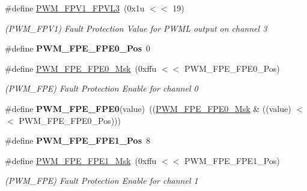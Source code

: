 \begin{DoxyCompactItemize}
\mbox{\label{group__SAMS70__PWM_ga7e0af5cbe9fed2f4df286fc02af113bf}} 
\#define \mbox{\hyperlink{group__SAMS70__PWM_ga7e0af5cbe9fed2f4df286fc02af113bf}{P\+W\+M\+\_\+\+F\+P\+V1\+\_\+\+F\+P\+V\+L3}}~(0x1u $<$$<$ 19)
\begin{DoxyCompactList}\small\item\em (P\+W\+M\+\_\+\+F\+P\+V1) Fault Protection Value for P\+W\+ML output on channel 3 \end{DoxyCompactList}\item 
\mbox{\label{group__SAMS70__PWM_ga44078a843929dc1c69281b78ac024c86}} 
\#define {\bfseries P\+W\+M\+\_\+\+F\+P\+E\+\_\+\+F\+P\+E0\+\_\+\+Pos}~0
\item 
\mbox{\label{group__SAMS70__PWM_ga883b1a6b32d3255fe62e1e584659cb30}} 
\#define \mbox{\hyperlink{group__SAMS70__PWM_ga883b1a6b32d3255fe62e1e584659cb30}{P\+W\+M\+\_\+\+F\+P\+E\+\_\+\+F\+P\+E0\+\_\+\+Msk}}~(0xffu $<$$<$ P\+W\+M\+\_\+\+F\+P\+E\+\_\+\+F\+P\+E0\+\_\+\+Pos)
\begin{DoxyCompactList}\small\item\em (P\+W\+M\+\_\+\+F\+PE) Fault Protection Enable for channel 0 \end{DoxyCompactList}\item 
\mbox{\label{group__SAMS70__PWM_gada304e1da29948064fdb0d3398e71dd7}} 
\#define {\bfseries P\+W\+M\+\_\+\+F\+P\+E\+\_\+\+F\+P\+E0}(value)~((\mbox{\hyperlink{group__SAMV71__PWM_ga883b1a6b32d3255fe62e1e584659cb30}{P\+W\+M\+\_\+\+F\+P\+E\+\_\+\+F\+P\+E0\+\_\+\+Msk}} \& ((value) $<$$<$ P\+W\+M\+\_\+\+F\+P\+E\+\_\+\+F\+P\+E0\+\_\+\+Pos)))
\item 
\mbox{\label{group__SAMS70__PWM_gaf8d476de94ddf131fcc23c23cbbf4402}} 
\#define {\bfseries P\+W\+M\+\_\+\+F\+P\+E\+\_\+\+F\+P\+E1\+\_\+\+Pos}~8
\item 
\mbox{\label{group__SAMS70__PWM_ga41c1d32975b17740532d30eb42912879}} 
\#define \mbox{\hyperlink{group__SAMS70__PWM_ga41c1d32975b17740532d30eb42912879}{P\+W\+M\+\_\+\+F\+P\+E\+\_\+\+F\+P\+E1\+\_\+\+Msk}}~(0xffu $<$$<$ P\+W\+M\+\_\+\+F\+P\+E\+\_\+\+F\+P\+E1\+\_\+\+Pos)
\begin{DoxyCompactList}\small\item\em (P\+W\+M\+\_\+\+F\+PE) Fault Protection Enable for channel 1 \end{DoxyCompactList}\item 

\end{DoxyCompactItemize}
